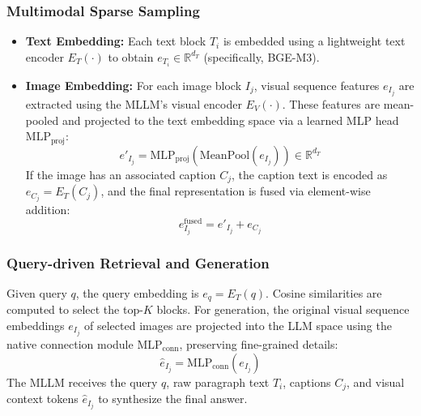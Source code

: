 \documentclass[11pt,a4paper]{article}
\begin{document}
\subsubsection{Multimodal Sparse Sampling}
\begin{itemize}
    \item \textbf{Text Embedding:} Each text block $T_i$ is embedded using a lightweight text encoder $E_T(\cdot)$ to obtain $e_{T_i} \in \mathbb{R}^{d_T}$ (specifically, BGE-M3).
    \item \textbf{Image Embedding:} For each image block $I_j$, visual sequence features $e_{I_j}$ are extracted using the MLLM's visual encoder $E_V(\cdot)$. These features are mean-pooled and projected to the text embedding space via a learned MLP head $\text{MLP}_{\text{proj}}$:
    \begin{equation}
    e'_{I_j} = \text{MLP}_{\text{proj}}(\text{MeanPool}(e_{I_j})) \in \mathbb{R}^{d_T}
    \end{equation}
    If the image has an associated caption $C_j$, the caption text is encoded as $e_{C_j} = E_T(C_j)$, and the final representation is fused via element-wise addition:
    \begin{equation}
    e^{\text{fused}}_{I_j} = e'_{I_j} + e_{C_j}
    \end{equation}
\end{itemize}

\subsubsection{Query-driven Retrieval and Generation}
Given query $q$, the query embedding is $e_q = E_T(q)$. Cosine similarities are computed to select the top-$K$ blocks. 
For generation, the original visual sequence embeddings $e_{I_j}$ of selected images are projected into the LLM space using the native connection module $\text{MLP}_{\text{conn}}$, preserving fine-grained details:
\begin{equation}
\hat{e}_{I_j} = \text{MLP}_{\text{conn}}(e_{I_j})
\end{equation}
The MLLM receives the query $q$, raw paragraph text $T_i$, captions $C_j$, and visual context tokens $\hat{e}_{I_j}$ to synthesize the final answer.
\end{document}
